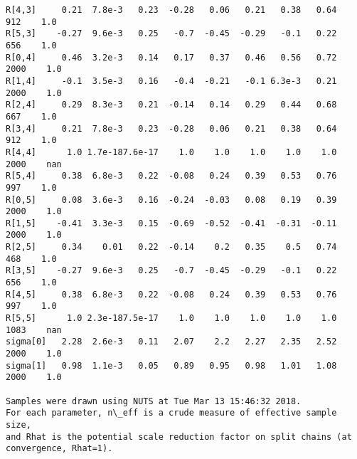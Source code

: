 \documentclass[11pt]{article}
\begin{document}
\begin{Verbatim}[commandchars=\\\{\}]
R[4,3]     0.21  7.8e-3   0.23  -0.28   0.06   0.21   0.38   0.64    912    1.0
R[5,3]    -0.27  9.6e-3   0.25   -0.7  -0.45  -0.29   -0.1   0.22    656    1.0
R[0,4]     0.46  3.2e-3   0.14   0.17   0.37   0.46   0.56   0.72   2000    1.0
R[1,4]     -0.1  3.5e-3   0.16   -0.4  -0.21   -0.1 6.3e-3   0.21   2000    1.0
R[2,4]     0.29  8.3e-3   0.21  -0.14   0.14   0.29   0.44   0.68    667    1.0
R[3,4]     0.21  7.8e-3   0.23  -0.28   0.06   0.21   0.38   0.64    912    1.0
R[4,4]      1.0 1.7e-187.6e-17    1.0    1.0    1.0    1.0    1.0   2000    nan
R[5,4]     0.38  6.8e-3   0.22  -0.08   0.24   0.39   0.53   0.76    997    1.0
R[0,5]     0.08  3.6e-3   0.16  -0.24  -0.03   0.08   0.19   0.39   2000    1.0
R[1,5]    -0.41  3.3e-3   0.15  -0.69  -0.52  -0.41  -0.31  -0.11   2000    1.0
R[2,5]     0.34    0.01   0.22  -0.14    0.2   0.35    0.5   0.74    468    1.0
R[3,5]    -0.27  9.6e-3   0.25   -0.7  -0.45  -0.29   -0.1   0.22    656    1.0
R[4,5]     0.38  6.8e-3   0.22  -0.08   0.24   0.39   0.53   0.76    997    1.0
R[5,5]      1.0 2.3e-187.5e-17    1.0    1.0    1.0    1.0    1.0   1083    nan
sigma[0]   2.28  2.6e-3   0.11   2.07    2.2   2.27   2.35   2.52   2000    1.0
sigma[1]   0.98  1.1e-3   0.05   0.89   0.95   0.98   1.01   1.08   2000    1.0

Samples were drawn using NUTS at Tue Mar 13 15:46:32 2018.
For each parameter, n\_eff is a crude measure of effective sample size,
and Rhat is the potential scale reduction factor on split chains (at 
convergence, Rhat=1).

    \end{Verbatim}
\end{document}
